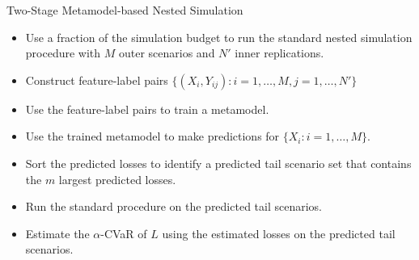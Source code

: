 \documentclass[9pt,handout]{beamer}
\begin{document}
\begin{frame}{Two-Stage Metamodel-based Nested Simulation}

\begin{algorithm}[H]
    \caption{Two-Stage Metamodel-based Nested Simulation for VAs}

\begin{algorithmic}[1]
    \begin{itemize}
        \item Use a fraction of the simulation budget to run the standard nested simulation procedure with $M$ outer scenarios and $N'$ inner replications.
        \item Construct feature-label pairs $\{(X_i, Y_{ij}) : i=1, \ldots, M, j=1, \ldots, N'\}$
    \end{itemize}
    \begin{itemize}
        \item Use the feature-label pairs to train a metamodel.
        \item Use the trained metamodel to make predictions for $\{X_i: i=1, \ldots, M\}$.
        \item Sort the predicted losses to identify a predicted tail scenario set that contains the $m$ largest predicted losses.
    \end{itemize}
    \begin{itemize}
        \item Run the standard procedure on the predicted tail scenarios.
        \item Estimate the $\alpha$-CVaR of $L$ using the estimated losses on the predicted tail scenarios.
    \end{itemize}
\end{algorithmic}
\end{algorithm}

\end{frame}
\end{document}
